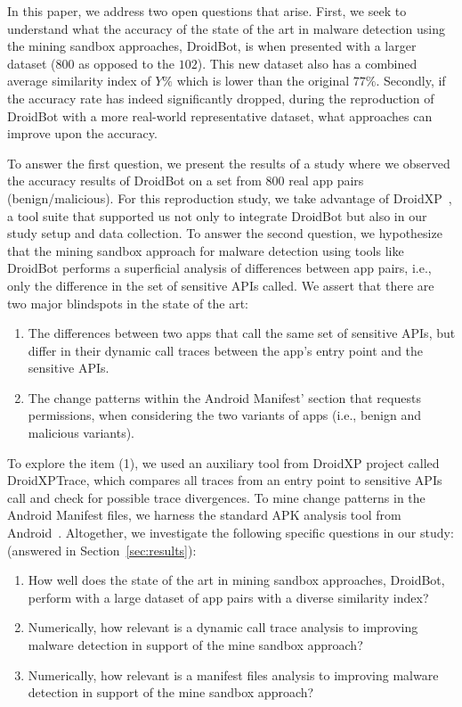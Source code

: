 In this paper, we address two open questions that arise. First, we seek to understand what the accuracy of the state of the art in malware detection using the mining sandbox approaches, DroidBot, is when presented with a larger dataset ($800$ as opposed to the $102$). This new dataset also has a combined average similarity index of $Y\%$ which is lower than the original $77\%$. Secondly, if the accuracy rate has indeed significantly dropped, during the reproduction of DroidBot with a more real-world representative dataset, what approaches can improve upon the accuracy. 

To answer the first question, we present the results of a study where we observed the accuracy results of DroidBot on a set from $800$ real app pairs (benign/malicious). For this reproduction study, we take advantage of DroidXP~\cite{DBLP:conf/scam/CostaMCMVBC20}, a tool suite that supported us not only to integrate DroidBot but also in our study setup and data collection. To answer the second question, we hypothesize that the mining sandbox approach for malware detection using tools like DroidBot performs a superficial analysis of differences between app pairs, i.e., only the difference in the set of sensitive APIs called. We assert that there are two major blindspots in the state of the art:

\begin{enumerate}
    \item The differences between two apps that call the same set of sensitive APIs, but differ in their dynamic call traces between the app's entry point and the sensitive APIs.
    \item The {\color{blue}change patterns} within the Android Manifest' section that requests permissions, when considering the two variants of apps (i.e., benign and malicious variants).
\end{enumerate}

To explore the item (1), we used an auxiliary tool from DroidXP project called DroidXPTrace, which compares all traces from an entry point to sensitive APIs call and check for possible trace divergences. To {\color{blue}mine change patterns} in the Android Manifest files, we harness the standard APK analysis tool from Android~\cite{au2011short}. Altogether, we investigate the following specific questions in our study: (answered in Section~\ref{sec:results}):

\begin{enumerate}[(RQ1)]
 \item How well does the state of the art in mining sandbox approaches, DroidBot, perform with a large dataset of app pairs with a diverse similarity index?
 \item Numerically, how relevant is a dynamic call trace analysis to improving malware detection in support of the mine sandbox approach?
 \item Numerically, how relevant is a manifest files analysis to improving malware detection in support of the mine sandbox approach?
\end{enumerate}
 

